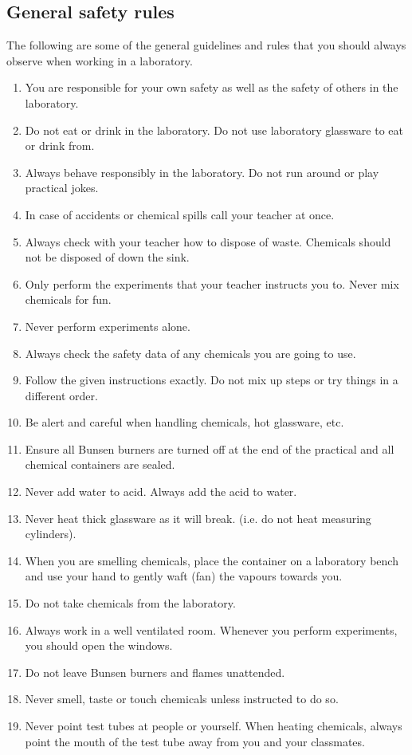 \subsection*{General safety rules}
            \nopagebreak
The following are some of the general guidelines and rules that you should always observe when working in a laboratory.
\begin{enumerate}[noitemsep, label=\textbf{\arabic*}. ] 
\item You are responsible for your own safety as well as the safety of others in the laboratory.
\item Do not eat or drink in the laboratory. Do not use laboratory glassware to eat or drink from.
\item Always behave responsibly in the laboratory. Do not run around or play practical jokes.
\item In case of accidents or chemical spills call your teacher at once.
\item Always check with your teacher how to dispose of waste. Chemicals should not be disposed of down the sink.
\item Only perform the experiments that your teacher instructs you to. Never mix chemicals for fun.
\item Never perform experiments alone. 
\item Always check the safety data of any chemicals you are going to use. 
\item Follow the given instructions exactly. Do not mix up steps or try things in a different order.
\item Be alert and careful when handling chemicals, hot glassware, etc.  
\item Ensure all Bunsen burners are turned off at the end of the practical and all chemical containers are sealed.
\item Never add water to acid. Always add the acid to water.
\item Never heat thick glassware as it will break. (i.e. do not heat measuring cylinders).
\item When you are smelling chemicals, place the container on a laboratory bench and use your hand to gently waft (fan) the vapours towards you.
\item Do not take chemicals from the laboratory.
\item Always work in a well ventilated room. Whenever you perform experiments, you should open the windows.
\item Do not leave Bunsen burners and flames unattended. 
\item Never smell, taste or touch chemicals unless instructed to do so.
\item Never point test tubes at people or yourself. When heating chemicals, always point the mouth of the test tube away from you and your classmates.
\end{enumerate}
\par 
